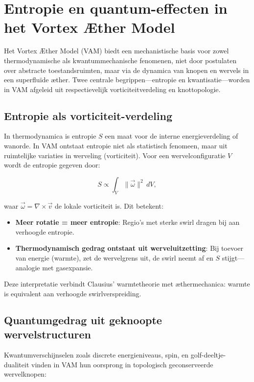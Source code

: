 
\section{Entropie en quantum-effecten in het Vortex Æther Model}

Het Vortex Æther Model (VAM) biedt een mechanistische basis voor zowel thermodynamische als kwantummechanische fenomenen, niet door postulaten over abstracte toestandsruimten, maar via de dynamica van knopen en wervels in een superfluïde æther. Twee centrale begrippen—entropie en kwantisatie—worden in VAM afgeleid uit respectievelijk vorticiteitverdeling en knottopologie.

\subsection{Entropie als vorticiteit-verdeling}

In thermodynamica is entropie $S$ een maat voor de interne energieverdeling of wanorde. In VAM ontstaat entropie niet als statistisch fenomeen, maar uit ruimtelijke variaties in werveling (vorticiteit). Voor een wervelconfiguratie $V$ wordt de entropie gegeven door:

\begin{equation}
S \propto \int_V \|\vec{\omega}\|^2 \, dV,
\end{equation}

waar $\vec{\omega} = \nabla \times \vec{v}$ de lokale vorticiteit is. Dit betekent:

\begin{itemize}
    \item \textbf{Meer rotatie = meer entropie}: Regio's met sterke swirl dragen bij aan verhoogde entropie.
    \item \textbf{Thermodynamisch gedrag ontstaat uit werveluitzetting}: Bij toevoer van energie (warmte), zet de wervelgrens uit, de swirl neemt af en $S$ stijgt—analogie met gasexpansie.
\end{itemize}

Deze interpretatie verbindt Clausius' warmtetheorie met æthermechanica: warmte is equivalent aan verhoogde swirlverspreiding.

\subsection{Quantumgedrag uit geknoopte wervelstructuren}

Kwantumverschijnselen zoals discrete energieniveaus, spin, en golf-deeltje-dualiteit vinden in VAM hun oorsprong in topologisch geconserveerde wervelknopen:

